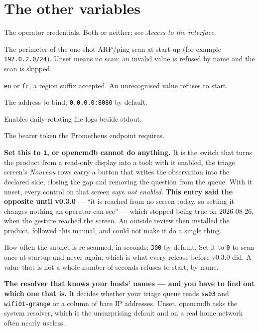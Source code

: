 \documentclass[11pt,oneside,listof=totoc,bibliography=totoc]{scrreprt}
\begin{document}
\section{The other variables}
\begin{description}[style=nextline,leftmargin=0pt]
  \item[\texttt{OPENCMDB\_BASIC\_USER} / \texttt{OPENCMDB\_BASIC\_PASSWORD}] The operator
    credentials. Both or neither; see \emph{Access to the interface}.
  \item[\texttt{OPENCMDB\_SCAN\_CIDR}] The perimeter of the one-shot ARP/ping scan at start-up
    (for example \texttt{192.0.2.0/24}). Unset means no scan; an invalid value is refused by
    name and the scan is skipped.
  \item[\texttt{OPENCMDB\_LOCALE}] \texttt{en} or \texttt{fr}, a region suffix accepted. An
    unrecognised value refuses to start.
  \item[\texttt{OPENCMDB\_BIND}] The address to bind; \texttt{0.0.0.0:8080} by default.
  \item[\texttt{OPENCMDB\_LOG\_DIR}] Enables daily-rotating file logs beside stdout.
  \item[\texttt{OPENCMDB\_METRICS\_TOKEN}] The bearer token the Prometheus endpoint requires.
  \item[\texttt{OPENCMDB\_DOCUMENT\_ENABLED}] \textbf{Set this to \texttt{1}, or opencmdb
    cannot do anything.} It is the switch that turns the product from a read-only display into a
    tool: with it enabled, the triage screen's \emph{Nouveau} rows carry a button that writes the
    observation into the declared side, closing the gap and removing the question from the queue.
    With it unset, every control on that screen says \emph{not enabled}.
    \textbf{This entry said the opposite until v0.3.0} --- ``it is reached from no screen today,
    so setting it changes nothing an operator can see'' --- which stopped being true on
    2026-08-26, when the gesture reached the screen. An outside review then installed the product,
    followed this manual, and could not make it do a single thing.
  \item[\texttt{OPENCMDB\_SCAN\_INTERVAL\_SECS}] How often the subnet is re-scanned, in
    seconds; \texttt{300} by default. Set it to \texttt{0} to scan once at startup and never
    again, which is what every release before v0.3.0 did. A value that is not a whole number of
    seconds refuses to start, by name.
  \item[\texttt{OPENCMDB\_DNS\_SERVER}] \textbf{The resolver that knows your hosts' names ---
    and you have to find out which one that is.} It decides whether your triage queue reads
    \texttt{sw03} and \texttt{wifi01-grange} or a column of bare IP addresses. Unset, opencmdb
    asks the system resolver, which is the unsurprising default and on a real home network often
    nearly useless.


\end{description}
\end{document}
